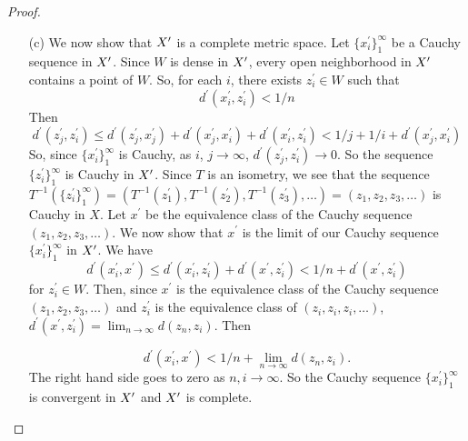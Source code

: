 \begin{solution}
\begin{proof}
\begin{enumerate}
                    \vspace*{3mm}
                    \item[(c)] We now show that $X^\prime$ is a complete
                    metric space. Let $\{x_i^\prime\}_1^\infty$
                    be a Cauchy sequence in $X^\prime$. Since
                    $W$ is dense in $X^\prime$, every open
                    neighborhood in $X^\prime$ contains a point of $W$.
                    So, for each $i$,
                    there exists $z_i^\prime\in W$ such that
                    $$d^\prime(x_i^\prime,z_i^\prime)<1/n$$
                    Then
                    $$d^\prime(z_j^\prime,z_i^\prime)\leq
                    d^\prime(z_j^\prime,x_j^\prime)+
                    d^\prime(x_j^\prime,x_i^\prime)+
                    d^\prime(x_i^\prime,z_i^\prime)<
                    1/j+1/i+
                    d^\prime(x_j^\prime,x_i^\prime)$$
                    So, since $\{x_i^\prime\}_1^\infty$
                    is Cauchy, as $i$, $j\to \infty$,
                    $d^\prime(z_j^\prime,z_i^\prime)\to
                    0$. So the sequence
                    $\{z_i^\prime\}_1^\infty$ is Cauchy in $X^\prime$.
                    Since $T$ is an isometry,
                    we see that the sequence
                    $T^{-1}(\{z_i^\prime\}_1^\infty)=(
                        T^{-1}(z_1^\prime),T^{-1}(z_2^\prime),
                        T^{-1}(z_3^\prime),
                        \ldots
                    )=(z_1,z_2,z_3,\ldots)$ is Cauchy in $X$.
                    Let $x^\prime$ be the equivalence class of
                    the Cauchy sequence $(z_1,z_2,z_3,\ldots)$.
                    We now show that $x^\prime$ is the limit
                    of our Cauchy sequence
                    $\{x_i^\prime\}_1^\infty$ in $X^\prime$.
                    We have
                    $$d^\prime(x_i^\prime,x^\prime)
                    \leq d^\prime(x_i^\prime,z_i^\prime)+
                    d^\prime(x^\prime,z_i^\prime)
                    <1/n+d^\prime(x^\prime,z_i^\prime)$$
                    for $z_i^\prime\in W$. Then, since
                    $x^\prime$ is the equivalence class of
                    the Cauchy sequence $(z_1,z_2,z_3,\ldots)$
                    and $z_i^\prime$ is the equivalence
                    class of $(z_i,z_i,z_i,\ldots)$,
                    $d^\prime(x^\prime,z_i^\prime)=
                    \lim_{n\to\infty}{d(z_n,z_i)}$. Then
        
                    $$d^\prime(x_i^\prime,x^\prime)<
                    1/n+\lim_{n\to\infty}{d(z_n,z_i)}.$$
                    The right hand side goes to zero as $n,i\to
                    \infty$. So the Cauchy sequence
                    $\{x_i^\prime\}_1^\infty$ is convergent in
                    $X^\prime$ and $X^\prime$ is complete.
        

\end{enumerate}
\end{proof}
\end{solution}
